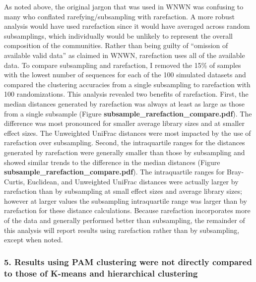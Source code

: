 \documentclass[
]{article}
\begin{document}
As noted above, the original jargon that was used in WNWN was confusing
to many who conflated rarefying/subsampling with rarefaction. A more
robust analysis would have used rarefaction since it would have averaged
across random subsamplings, which individually would be unlikely to
represent the overall composition of the communities. Rather than being
guilty of ``omission of available valid data'' as claimed in WNWN,
rarefaction uses all of the available data. To compare subsampling and
rarefaction, I removed the 15\% of samples with the lowest number of
sequences for each of the 100 simulated datasets and compared the
clustering accuracies from a single subsampling to rarefaction with 100
randomizations. This analysis revealed two benefits of rarefaction.
First, the median distances generated by rarefaction was always at least
as large as those from a single subsample (Figure
\textbf{subsample\_rarefaction\_compare.pdf}). The difference was most
pronounced for smaller average library sizes and at smaller effect
sizes. The Unweighted UniFrac distances were most impacted by the use of
rarefaction over subsampling. Second, the intraquartile ranges for the
distances generated by rarefaction were generally smaller than those by
subsampling and showed similar trends to the difference in the median
distances (Figure \textbf{subsample\_rarefaction\_compare.pdf}). The
intraquartile ranges for Bray-Curtis, Euclidean, and Unweighted UniFrac
distances were actually larger by rarefaction than by subsampling at
small effect sizes and average library sizes; however at larger values
the subsampling intraquartile range was larger than by rarefaction for
these distance calculations. Because rarefaction incorporates more of
the data and generally performed better than subsampling, the remainder
of this analysis will report results using rarefaction rather than by
subsampling, except when noted.

\hypertarget{results-using-pam-clustering-were-not-directly-compared-to-those-of-k-means-and-hierarchical-clustering}{%
\subsubsection{5. Results using PAM clustering were not directly
compared to those of K-means and hierarchical
clustering}\label{results-using-pam-clustering-were-not-directly-compared-to-those-of-k-means-and-hierarchical-clustering}}
\end{document}
